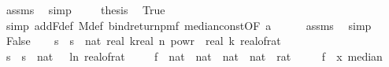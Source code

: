 \begin{isabellebody}
\ assms\ \isamarkupfalse%
\ simp\ \isanewline
\ \ \isamarkupfalse%
\ {\isacharquery}{\kern0pt}thesis\ \isamarkupfalse%
\ True\ \isamarkupfalse%
\ {\isacharparenleft}{\kern0pt}simp\ add{\isacharcolon}{\kern0pt}F{\isacharunderscore}{\kern0pt}def\ M{\isacharunderscore}{\kern0pt}def\ bind{\isacharunderscore}{\kern0pt}return{\isacharunderscore}{\kern0pt}pmf\ median{\isacharunderscore}{\kern0pt}const{\isacharbrackleft}{\kern0pt}OF\ a{\isacharbrackright}{\kern0pt}{\isacharparenright}{\kern0pt}\isanewline
\ \ \ \ \isamarkupfalse%
\ assms{\isacharparenleft}{\kern0pt}{}{\isacharparenright}{\kern0pt}\ \isamarkupfalse%
\ simp\isanewline
{}\isamarkupfalse%
\isanewline
\ \ \isamarkupfalse%
\ False\isanewline
\ \ \isamarkupfalse%
\ s\ \ {\isachardoublequoteopen}s\ {\isacharequal}{\kern0pt}\ nat\ {\isasymlceil}{}{\isacharasterisk}{\kern0pt}real\ k{\isacharasterisk}{\kern0pt}{\isacharparenleft}{\kern0pt}real\ n{\isacharparenright}{\kern0pt}\ powr\ {\isacharparenleft}{\kern0pt}{}{\isacharminus}{\kern0pt}{}{\isacharslash}{\kern0pt}\ real\ k{\isacharparenright}{\kern0pt}{\isacharslash}{\kern0pt}\ {\isacharparenleft}{\kern0pt}real{\isacharunderscore}{\kern0pt}of{\isacharunderscore}{\kern0pt}rat\ {\isasymdelta}{\isacharparenright}{\kern0pt}\isanewline
\ \ \isamarkupfalse%
\ s\ \ {\isachardoublequoteopen}s\ {\isacharequal}{\kern0pt}\ nat\ {\isasymlceil}{\isacharminus}{\kern0pt}{\isacharparenleft}{\kern0pt}{}{}\ {\isacharasterisk}{\kern0pt}\ ln\ {\isacharparenleft}{\kern0pt}real{\isacharunderscore}{\kern0pt}of{\isacharunderscore}{\kern0pt}rat\ {\isasymepsilon}{\isacharparenright}{\kern0pt}{\isacharparenright}{\kern0pt}{\isasymrceil}{\isachardoublequoteclose}\isanewline
\isanewline
\ \ \isamarkupfalse%
\ f\ {\isacharcolon}{\kern0pt}{\isacharcolon}{\kern0pt}\ {\isachardoublequoteopen}{\isacharparenleft}{\kern0pt}nat\ {\isasymtimes}\ nat\ {\isasymRightarrow}\ {\isacharparenleft}{\kern0pt}nat\ {\isasymtimes}\ nat{\isacharparenright}{\kern0pt}{\isacharparenright}{\kern0pt}\ {\isasymRightarrow}\ rat{\isachardoublequoteclose}\isanewline
\ \ \ \ \ {\isachardoublequoteopen}f\ {\isacharequal}{\kern0pt}\ {\isacharparenleft}{\kern0pt}{\isasymlambda}x{\isachardot}{\kern0pt}\ median\isanewline

\end{isabellebody}
